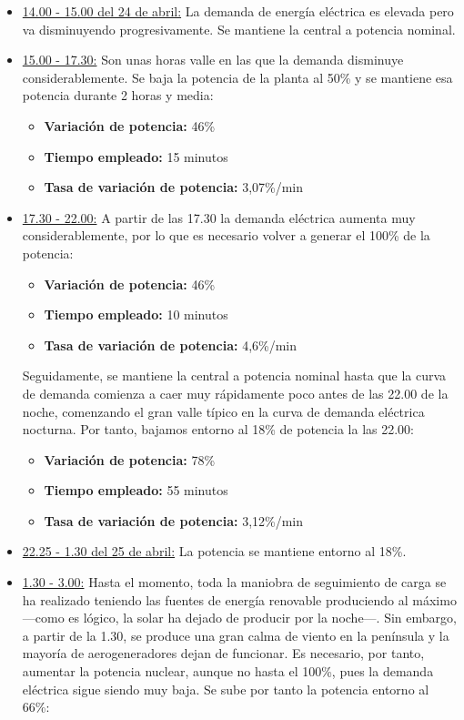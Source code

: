 \begin{itemize}
  \item \underline{14.00 - 15.00 del 24 de abril:} La demanda de energía eléctrica es elevada pero va disminuyendo progresivamente. Se mantiene la central a potencia nominal.
  \item \underline{15.00 - 17.30:} Son unas horas valle en las que la demanda disminuye considerablemente. Se baja la potencia de la planta al 50\% y se mantiene esa potencia durante 2 horas y media:
  \begin{itemize}
    \item \textbf{Variación de potencia:} 46\%
    \item \textbf{Tiempo empleado:} 15 minutos
    \item \textbf{Tasa de variación de potencia:} 3,07\%/min
  \end{itemize} 
  \item \underline{17.30 - 22.00:} A partir de las 17.30 la demanda eléctrica aumenta muy considerablemente, por lo que es necesario volver a generar el 100\% de la potencia:
  \begin{itemize}
    \item \textbf{Variación de potencia:} 46\%
    \item \textbf{Tiempo empleado:} 10 minutos
    \item \textbf{Tasa de variación de potencia:} 4,6\%/min
  \end{itemize} 
  Seguidamente, se mantiene la central a potencia nominal hasta que la curva de demanda comienza a caer muy rápidamente poco antes de las 22.00 de la noche, comenzando el gran valle típico en la curva de demanda eléctrica nocturna. Por tanto, bajamos entorno al 18\% de potencia la las 22.00:
  \begin{itemize}
    \item \textbf{Variación de potencia:} 78\%
    \item \textbf{Tiempo empleado:} 55 minutos
    \item \textbf{Tasa de variación de potencia:} 3,12\%/min
  \end{itemize}
  \item \underline{22.25 - 1.30 del 25 de abril:} La potencia se mantiene entorno al 18\%.
  \item \underline{1.30 - 3.00:} Hasta el momento, toda la maniobra de seguimiento de carga se ha realizado teniendo las fuentes de energía renovable produciendo al máximo ---como es lógico, la solar ha dejado de producir por la noche---. Sin embargo, a partir de la 1.30, se produce una gran calma de viento en la península y la mayoría de aerogeneradores dejan de funcionar. Es necesario, por tanto, aumentar la potencia nuclear, aunque no hasta el 100\%, pues la demanda eléctrica sigue siendo muy baja. Se sube por tanto la potencia entorno al 66\%: 

\end{itemize}
